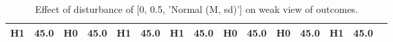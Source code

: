 \begin{table}
\begin{tabular}{l|cc|cc|cc|cc|cc|cc|cc}
\cellcolor{Bittersweet}H1&\cellcolor{Bittersweet}45.0&\cellcolor{Bittersweet}H0&\cellcolor{Bittersweet}45.0&\cellcolor{Bittersweet}H1&\cellcolor{Bittersweet}45.0&\cellcolor{Bittersweet}H1&\cellcolor{Bittersweet}45.0&\cellcolor{Bittersweet}H0&\cellcolor{Bittersweet}45.0&\cellcolor{Bittersweet}H0&\cellcolor{Bittersweet}45.0&\cellcolor{Bittersweet}H1&\cellcolor{Bittersweet}45.0\\\bottomrule\end{tabular}\caption{Effect of disturbance of [0, 0.5, 'Normal (M, sd)'] on weak view of outcomes.}\end{table}